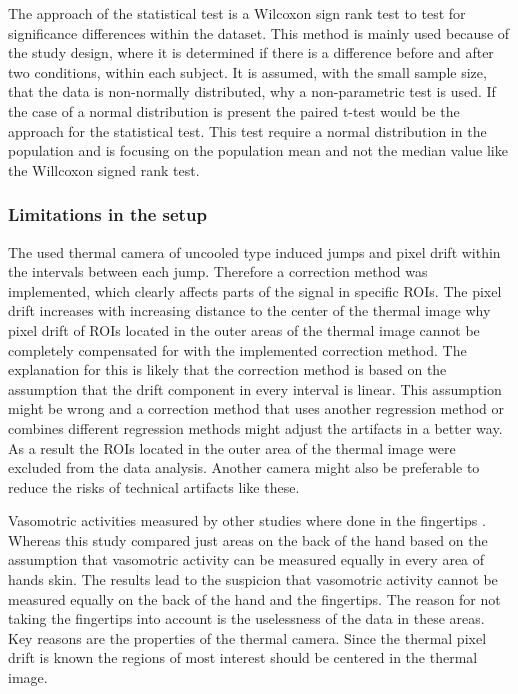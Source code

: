 The approach of the statistical test is a Wilcoxon sign rank test to test for significance differences within the dataset. This method is mainly used because of the study design, where it is determined if there is a difference before and after two conditions, within each subject. It is assumed, with the small sample size, that the data is non-normally distributed, why a non-parametric test is used. If the case of a normal distribution is present the paired t-test would be the approach for the statistical test. This test require a normal distribution in the population and is focusing on the population mean and not the median value like the Willcoxon signed rank test\cite{imam2014}.

\subsubsection{Limitations in the setup}
The used thermal camera of uncooled type induced jumps and pixel drift within the intervals between each jump. Therefore a correction method was implemented, which clearly affects parts of the signal in specific ROIs. The pixel drift increases with increasing distance to the center of the thermal image why pixel drift of ROIs located in the outer areas of the thermal image cannot be completely compensated for with the implemented correction method. The explanation for this is likely that the correction method is based on the assumption that the drift component in every interval is linear. This assumption might be wrong and a correction method that uses another regression method or combines different regression methods might adjust the artifacts in a better way. As a result the ROIs located in the outer area of the thermal image were excluded from the data analysis. Another camera might also be preferable to reduce the risks of technical artifacts like these. 

Vasomotric activities measured by other studies where done in the fingertips \cite{sagaidachnyi2012a, sagaidachnyi2014}. Whereas this study compared just areas on the back of the hand based on the assumption that vasomotric activity can be measured equally in every area of hands skin. The results lead to the suspicion that vasomotric activity cannot be measured equally on the back of the hand and the fingertips. The reason for not taking the fingertips into account is the uselessness of the data in these areas. Key reasons are the properties of the thermal camera. Since the thermal pixel drift is known the regions of most interest should be centered in the thermal image. 

